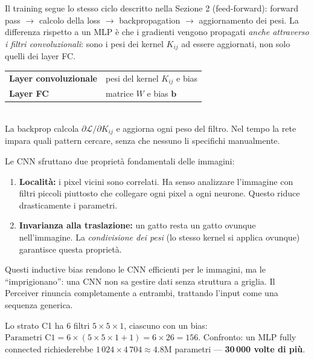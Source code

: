 \documentclass[
  11pt,
]{article}
\begin{document}
Il training segue lo stesso ciclo descritto nella Sezione 2 (feed-forward): forward pass $\to$ calcolo della loss $\to$ backpropagation $\to$ aggiornamento dei pesi. La differenza rispetto a un MLP è che i gradienti vengono propagati \emph{anche attraverso i filtri convoluzionali}: sono i pesi dei kernel $K_{ij}$ ad essere aggiornati, non solo quelli dei layer FC.

\begin{formulabox}[title={\textbf{Cosa si aggiorna durante il training}}]
\begin{tabular}{ll}
\textbf{Layer convoluzionale} & pesi del kernel $K_{ij}$ e bias \\
\textbf{Layer FC} & matrice $W$ e bias $\mathbf{b}$ \\
\end{tabular}\\[4pt]
La backprop calcola $\partial\mathcal{L}/\partial K_{ij}$ e aggiorna ogni peso del filtro. Nel tempo la rete impara quali pattern cercare, senza che nessuno li specifichi manualmente.
\end{formulabox}

\begin{notabox}[title={\textbf{In parole semplici: i due inductive bias delle CNN}}]
Le CNN sfruttano due proprietà fondamentali delle immagini:
\begin{enumerate}
\item \textbf{Località:} i pixel vicini sono correlati. Ha senso analizzare l'immagine con filtri piccoli piuttosto che collegare ogni pixel a ogni neurone. Questo riduce drasticamente i parametri.
\item \textbf{Invarianza alla traslazione:} un gatto resta un gatto ovunque nell'immagine. La \emph{condivisione dei pesi} (lo stesso kernel si applica ovunque) garantisce questa proprietà.
\end{enumerate}
Questi inductive bias rendono le CNN efficienti per le immagini, ma le ``imprigionano'': una CNN non sa gestire dati senza struttura a griglia. Il Perceiver rinuncia completamente a entrambi, trattando l'input come una sequenza generica.
\end{notabox}

\begin{notabox}[title={\textbf{Esempio numerico: conteggio parametri di C1 in LeNet-5}}]
Lo strato C1 ha 6 filtri $5 \times 5 \times 1$, ciascuno con un bias:
$\text{Parametri C1} = 6 \times (5 \times 5 \times 1 + 1) = 6 \times 26 = 156$.
Confronto: un MLP fully connected richiederebbe $1\,024 \times 4\,704 \approx 4.8\text{M}$ parametri --- \textbf{30\,000 volte di più}.
\end{notabox}
\end{document}
